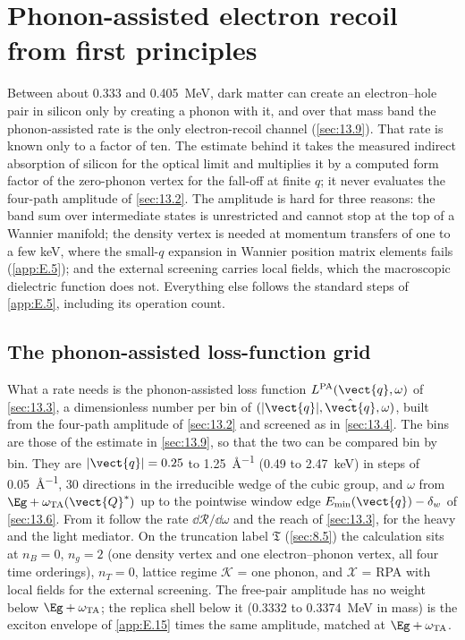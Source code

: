 \section{Phonon-assisted electron recoil from first principles}\label{app:E.14}

Between about 0.333 and \SI{0.405}{MeV}, dark matter can create an electron--hole pair in silicon only by creating a phonon with it, and over that mass band the phonon-assisted rate is the only electron-recoil channel (\cref{sec:13.9}). That rate is known only to a factor of ten. The estimate behind it takes the measured indirect absorption of silicon for the optical limit and multiplies it by a computed form factor of the zero-phonon vertex for the fall-off at finite $q$; it never evaluates the four-path amplitude of \cref{sec:13.2}. The amplitude is hard for three reasons: the band sum over intermediate states is unrestricted and cannot stop at the top of a Wannier manifold; the density vertex is needed at momentum transfers of one to a few keV, where the small-$q$ expansion in Wannier position matrix elements fails (\cref{app:E.5}); and the external screening carries local fields, which the macroscopic dielectric function does not. Everything else follows the standard steps of \cref{app:E.5}, including its operation count.

\subsection{The phonon-assisted loss-function grid}

What a rate needs is the phonon-assisted loss function $L^{\mathrm{PA}}(\vect{q},\omega)$ of \cref{sec:13.3}, a dimensionless number per bin of $(|\vect{q}|,\hat{\vect{q}},\omega)$, built from the four-path amplitude of \cref{sec:13.2} and screened as in \cref{sec:13.4}. The bins are those of the estimate in \cref{sec:13.9}, so that the two can be compared bin by bin. They are $|\vect{q}| = 0.25$ to \SI{1.25}{\angstrom^{-1}} (0.49 to \SI{2.47}{keV}) in steps of \SI{0.05}{\angstrom^{-1}}, 30 directions in the irreducible wedge of the cubic group, and $\omega$ from $\Eg + \omega_{\mathrm{TA}}(\vect{Q}^*)$ up to the pointwise window edge $E_{\mathrm{min}}(\vect{q}) - \delta_w$ of \cref{sec:13.6}. From it follow the rate $\dd\mathcal{R}/\dd\omega$ and the reach of \cref{sec:13.3}, for the heavy and the light mediator. On the truncation label $\mathfrak{T}$ (\cref{sec:8.5}) the calculation sits at $n_B = 0$, $n_g = 2$ (one density vertex and one electron--phonon vertex, all four time orderings), $n_T = 0$, lattice regime $\mathcal{K}$ = one phonon, and $\mathcal{X}$ = RPA with local fields for the external screening. The free-pair amplitude has no weight below $\Eg + \omega_{\mathrm{TA}}$; the replica shell below it (0.3332 to \SI{0.3374}{MeV} in mass) is the exciton envelope of \cref{app:E.15} times the same amplitude, matched at $\Eg + \omega_{\mathrm{TA}}$.

